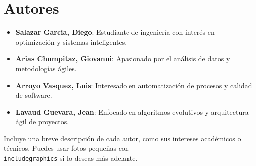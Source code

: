 \section*{Autores}

\begin{itemize}
  \item \textbf{Salazar Garcia, Diego}: Estudiante de ingeniería con interés en optimización y sistemas inteligentes.

  \item \textbf{Arias Chumpitaz, Giovanni}: Apasionado por el análisis de datos y metodologías ágiles.

  \item \textbf{Arroyo Vasquez, Luis}: Interesado en automatización de procesos y calidad de software.

  \item \textbf{Lavaud Guevara, Jean}: Enfocado en algoritmos evolutivos y arquitectura ágil de proyectos.
\end{itemize}

\vspace{0.5cm}

\begin{tcolorbox}[colback=gray!10, colframe=black!30, title={Sugerencia para esta sección}]
  Incluye una breve descripción de cada autor, como sus intereses académicos o técnicos. Puedes usar fotos pequeñas con \texttt{\\includegraphics} si lo deseas más adelante.
\end{tcolorbox}

